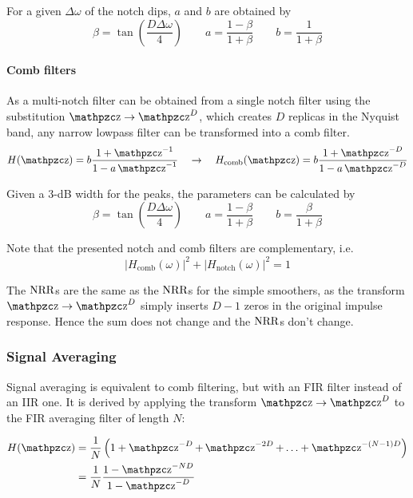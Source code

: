 For a given $\Delta\omega$ of the notch dips, $a$ and $b$  are obtained by
\begin{equation*}
	\beta = \tan\left(\frac{D\Delta\omega}{4}\right) \qquad a = \frac{1-\beta}{1+\beta} \qquad b = \frac{1}{1+\beta}
\end{equation*}

\paragraph{Comb filters}
As a multi-notch filter can be obtained from a single notch filter using the
substitution $\z \to \z^D$, which creates $D$ replicas in the Nyquist band,
any narrow lowpass filter can be transformed into a comb filter.
\begin{equation*}
	H(\z) = b \frac{1+\z^{-1}}{1-a\z^{-1}} \quad \to \quad
	H_{\text{comb}}(\z) = b \frac{1+\z^{-D}}{1-a\z^{-D}}
\end{equation*}

Given a 3-dB width for the peaks, the parameters can be calculated by
\begin{equation*}
	\beta = \tan\left(\frac{D\Delta\omega}{4}\right) \qquad
	a = \frac{1-\beta}{1+\beta} \qquad b = \frac{\beta}{1+\beta}
\end{equation*}

Note that the presented notch and comb filters are complementary, i.e.
\begin{equation*}
	\left|H_{\text{comb}}(\omega)\right|^2 + \left|H_{\text{notch}}(\omega)\right|^2 = 1
\end{equation*}

The $\operatorname{\text{NRR}}$s are the same as the $\operatorname{\text{NRR}}$s for the simple smoothers, as the
transform $\z \to \z^{D}$ simply inserts $D-1$ zeros in the original
impulse response. Hence the sum does not change and the $\operatorname{\text{NRR}}$s don't change.


\subsubsection{Signal Averaging}
Signal averaging is equivalent to comb filtering, but with an FIR filter
instead of an IIR one. It is derived by applying the transform $\z \to \z^{D}$
to the FIR averaging filter of length $N$:

\begin{align*}
	H(\z)&=\frac{1}{N}\left( 1+ \z^{-D}+\z^{-2D}+\ldots + \z^{-(N-1)D} \right) \\
	&= \frac{1}{N}\frac{1-\z^{-ND}}{1-\z^{-D}}
\end{align*}

